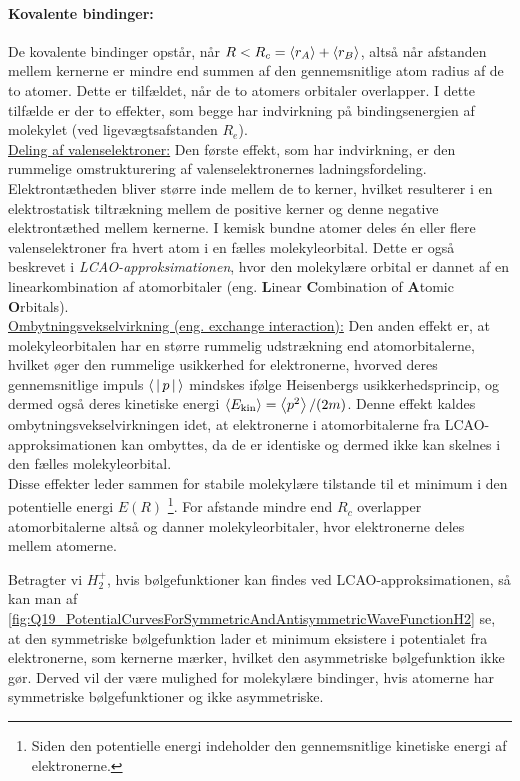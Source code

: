 \paragraph{Kovalente bindinger:} De kovalente bindinger opstår, når $R < R_c = \Braket{r_A} + \Braket{r_B}$, altså når afstanden mellem kernerne er mindre end summen af den gennemsnitlige atom radius af de to atomer. Dette er tilfældet, når de to atomers orbitaler overlapper. I dette tilfælde er der to effekter, som begge har indvirkning på bindingsenergien af molekylet (ved ligevægtsafstanden $R_e$).\\

\underline{Deling af valenselektroner:} Den første effekt, som har indvirkning, er den rummelige omstrukturering af valenselektronernes ladningsfordeling. Elektrontætheden bliver større inde mellem de to kerner, hvilket resulterer i en elektrostatisk tiltrækning mellem de positive kerner og denne negative elektrontæthed mellem kernerne. I kemisk bundne atomer deles én eller flere valenselektroner fra hvert atom i en fælles molekyleorbital. Dette er også beskrevet i \emph{LCAO-approksimationen}, hvor den molekylære orbital er dannet af en linearkombination af atomorbitaler (eng. \textbf{L}inear \textbf{C}ombination of \textbf{A}tomic \textbf{O}rbitals).\\

\underline{Ombytningsvekselvirkning (eng. exchange interaction):} Den anden effekt er, at molekyleorbitalen har en større rummelig udstrækning end atomorbitalerne, hvilket øger den rummelige usikkerhed for elektronerne, hvorved deres gennemsnitlige impuls $\Braket{|p|}$ mindskes ifølge Heisenbergs usikkerhedsprincip, og dermed også deres kinetiske energi $\Braket{E_\text{kin}} = \Braket{p^2}/(2m)$. Denne effekt kaldes ombytningsvekselvirkningen idet, at elektronerne i atomorbitalerne fra LCAO-approksimationen kan ombyttes, da de er identiske og dermed ikke kan skelnes i den fælles molekyleorbital.\\

Disse effekter leder sammen for stabile molekylære tilstande til et minimum i den potentielle energi $E(R)$ \footnote{Siden den potentielle energi indeholder den gennemsnitlige kinetiske energi af elektronerne.}. For afstande mindre end $R_c$ overlapper atomorbitalerne altså og danner molekyleorbitaler, hvor elektronerne deles mellem atomerne.

Betragter vi $H_2^+$, hvis bølgefunktioner kan findes ved LCAO-approksimationen, så kan man af \cref{fig:Q19_PotentialCurvesForSymmetricAndAntisymmetricWaveFunctionH2} se, at den symmetriske bølgefunktion lader et minimum eksistere i potentialet fra elektronerne, som kernerne mærker, hvilket den asymmetriske bølgefunktion ikke gør. Derved vil der være mulighed for molekylære bindinger, hvis atomerne har symmetriske bølgefunktioner og ikke asymmetriske.

